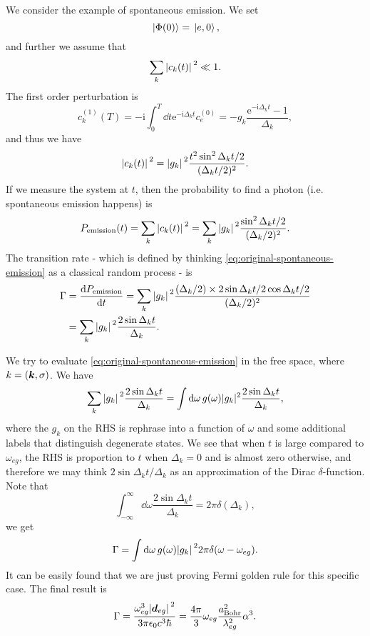 \documentclass[hyperref, a4paper]{article}
\newcommand*{\ii}{\mathrm{i}}
\newcommand*{\ee}{\mathrm{e}}
\begin{document}
We consider the example of spontaneous emission. We set 
\begin{equation}
    \ket*{\Phi(0)} = \ket*{e, 0},
\end{equation}
and further we assume that 
\begin{equation}
    \sum_k \abs*{c_k(t)}^2 \ll 1.
\end{equation}
The first order perturbation is 
\[
    c^{(1)}_k(T) = - \ii \int_0^T \dd{t} \ee^{- \ii \Delta_k t} c^{(0)}_e = - g_k \frac{\ee^{- \ii \Delta_k t} - 1}{\Delta_k},
\]
and thus we have 
\[
    \abs*{c_k(t)}^2 = \abs*{g_k}^2 \frac{t^2 \sin^2 \Delta_k t / 2}{(\Delta_k t / 2)^2} .
\]
If we measure the system at $t$, then the probability to find a photon (i.e. spontaneous emission happens) is 
\[
    P_\text{emission}(t) = \sum_k \abs*{c_k(t)}^2 = \sum_k \abs*{g_k}^2 \frac{ \sin^2 \Delta_k t / 2}{(\Delta_k / 2)^2} .
\]
The transition rate - which is defined by thinking \eqref{eq:original-spontaneous-emission} as a classical random process - is
\begin{equation}
    \begin{aligned}
        \Gamma &= \dv{P_\text{emission}}{t} = 
        \sum_k \abs*{g_k}^2 \frac{(\Delta_k / 2) \times 2 \sin \Delta_k t / 2 \cos \Delta_k t / 2 }{(\Delta_k / 2)^2} \\
        &= \sum_k \abs*{g_k}^2 \frac{2 \sin \Delta_k t  }{\Delta_k}.
    \end{aligned}
    \label{eq:original-spontaneous-emission}
\end{equation}

We try to evaluate \eqref{eq:original-spontaneous-emission} in the free space, where $k = (\vb*{k}, \sigma)$.
We have 
\[
    \sum_k \abs*{g_k}^2 \frac{2 \sin \Delta_k t  }{\Delta_k} 
    = \int \dd{\omega} g(\omega) |g_k|^2 \frac{2 \sin \Delta_k t}{\Delta_k},
\]
where the $g_k$ on the RHS is rephrase into a function of $\omega$ and some additional labels that distinguish degenerate states.
We see that when $t$ is large compared to $\omega_{eg}$, 
the RHS is proportion to $t$ when $\Delta_k = 0$ and is almost zero otherwise, 
and therefore we may think ${2 \sin \Delta_k t} / {\Delta_k}$ as an approximation of the Dirac $\delta$-function.
Note that 
\[
    \int_{-\infty}^\infty \dd{\omega} \frac{2 \sin \Delta_k t}{\Delta_k} = 2 \pi \delta(\Delta_k),
\]
we get 
\begin{equation}
    \Gamma = \int \dd{\omega} g(\omega) \abs*{g_k}^2 2\pi \delta(\omega - \omega_{eg}).
    \label{eq:fermi-golden-rule}
\end{equation}
It can be easily found that we are just proving Fermi golden rule for this specific case.
The final result is 
\begin{equation}
    \Gamma = \frac{\omega_{eg}^3 \abs*{\vb*{d}_{eg}}^2 }{3 \pi \epsilon_0 c^3 \hbar} 
    = \frac{4 \pi}{3} \omega_{eg} \frac{a_\text{Bohr}^2}{\lambda_{eg}^2} \alpha^3.
    \label{eq:spontaneous-emission-free-space}
\end{equation}
\end{document}
